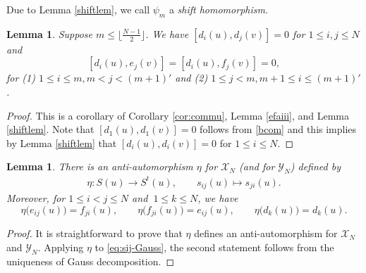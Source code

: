 \documentclass[11pt,reqno]{amsart}
\numberwithin{equation}{section}
\newtheorem{lem}[thm]{Lemma}
\theoremstyle{definition}
\theoremstyle{remark}
\newcommand{\lle}{\leqslant}
\newcommand{\Y}{{\mathscr{Y}}}
\begin{document}
Due to Lemma \ref{shiftlem}, we call $\psi_m$ a \emph{shift homomorphism}.

\begin{lem}\label{lemnew1}
Suppose $m\lle \lfloor \tfrac{N-1}{2}\rfloor$. We have $[d_i(u),d_j(v)]=0$ for $1\lle i,j\lle N$ and 
\[
[d_{i}(u),e_j(v)]=[d_{i}(u),f_j(v)]=0,
\]
for (1) $1\lle i\lle m, m<j<(m+1)'$ and (2) $1\lle j< m, m+1\lle i\lle (m+1)'$.
\end{lem}
\begin{proof}
This is a corollary of Corollary \ref{cor:commu}, Lemma \ref{efaiii}, and Lemma \ref{shiftlem}. Note that $[d_1(u),d_1(v)]=0$ follows from \eqref{bcom} and this implies by Lemma \ref{shiftlem} that $[d_i(u),d_i(v)]=0$ for $1\lle i\lle N$.
\end{proof}

\begin{lem}\label{lem:eta}
There is an anti-automorphism $\eta$ for $\mathscr X_N$ (and for $\Y_N$) defined by
\begin{align}\label{eta}
\eta:S(u)\longrightarrow S^t(u),\qquad s_{ij}(u)\mapsto s_{ji}(u).
\end{align}
Moreover, for $1\lle i<j\lle N$ and $\ 1\lle k\lle N$, we have
\[
\eta\big(e_{ij}(u)\big)=f_{ji}(u),\qquad \eta\big(f_{ji}(u)\big)=e_{ij}(u),\qquad \eta\big(d_{k}(u)\big)=d_{k}(u).
\]
\end{lem}
\begin{proof}
It is straightforward to prove that $\eta$ defines an anti-automorphism for $\mathscr X_N$ and $\Y_N$. Applying $\eta$ to \eqref{eq:sij-Gauss}, the second statement follows from the uniqueness of Gauss decomposition.
\end{proof}
\end{document}
